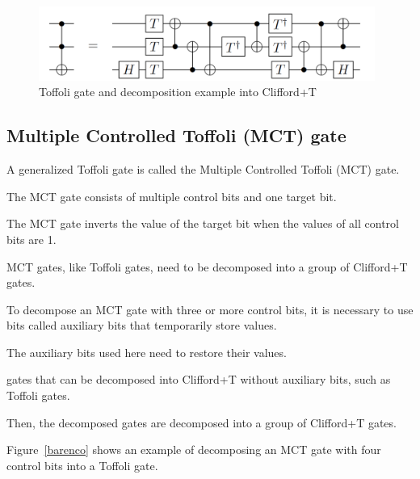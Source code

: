 {\begin{figure}[tbp]

\centering

\includegraphics[width=11cm]{img/toffoli.pdf}

\caption{Toffoli gate and decomposition example into Clifford+T\cite{amy2013meet}}

\label{toffoli}

\end{figure}

\subsection{Multiple Controlled Toffoli (MCT) gate}

A generalized Toffoli gate is called the Multiple Controlled Toffoli (MCT) gate\cite{barenco1995elementary}.

The MCT gate consists of multiple control bits and one target bit.

The MCT gate inverts the value of the target bit when the values of all control bits are 1.
\par
MCT gates, like Toffoli gates, need to be decomposed into a group of Clifford+T gates.

To decompose an MCT gate with three or more control bits,
it is necessary to use bits called auxiliary bits that temporarily store values.

The auxiliary bits used here need to restore their values.

gates that can be decomposed into Clifford+T without auxiliary bits,
such as Toffoli gates. }
Then, the decomposed gates are decomposed into a group of Clifford+T gates.

\par
Figure~\ref{barenco} shows an example of decomposing an MCT gate with four control bits into a Toffoli gate.

